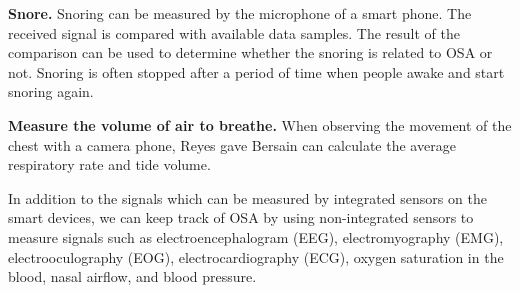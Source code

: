     \textbf{Snore. } Snoring can be measured by the microphone of a smart phone. The received signal is compared with available data samples. The result of the comparison can be used to determine whether the snoring is related to OSA or not. Snoring is often stopped after a period of time when people awake and start snoring again.

    \textbf{Measure the volume of air to breathe.} When observing the movement of the chest with a camera phone, Reyes gave Bersain\cite{BersainReyes} can calculate the average respiratory rate and tide volume.

    In addition to the signals which can be measured by integrated sensors on the smart devices, we can keep track of OSA by using non-integrated sensors to measure signals such as electroencephalogram (EEG), electromyography (EMG), electrooculography (EOG), electrocardiography (ECG), oxygen saturation in the blood, nasal airflow, and blood pressure.\\

